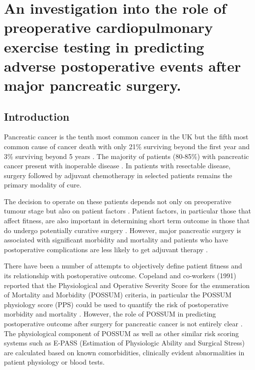 
\chapter{An investigation into the role of preoperative cardiopulmonary exercise testing in predicting adverse postoperative events after major pancreatic surgery.}
 
\label{ch_cpet_outcomes}
 
\clearpage
 
\section{Introduction}
Pancreatic cancer is the tenth most common cancer in the UK but the fifth most common cause of cancer death with only 21\% surviving beyond the first year and 3\% surviving beyond 5 years \parencite{cancerresearchuk_cancer_2011}. 
The majority of patients (80-85\%) with pancreatic cancer present with inoperable disease \parencite{cancerresearchuk_cancer_2011, sener_pancreatic_1999}. 
In patients with resectable disease, surgery \parencite{sener_pancreatic_1999, sohn_resected_2000, geer_prognostic_1993} followed by adjuvant chemotherapy in selected patients \parencite{neoptolemos_randomized_2004,neoptolemos_adjuvant_2009} remains the primary modality of cure.

The decision to operate on these patients depends not only on preoperative tumour stage but also on patient factors \parencite{bilimoria_national_2007, sandroussi_sociodemographics_2010}. 
Patient factors, in particular those that affect fitness, are also important in determining short term outcome in those that do undergo potentially curative surgery \parencite{mann_review_2010, mayo_management_2012}. 
However, major pancreatic surgery is associated with significant morbidity and mortality and patients who have postoperative complications are less likely to get adjuvant therapy \parencite{teh_patient_2009}.

There have been a number of attempts to objectively define patient fitness and its relationship with postoperative outcome. 
Copeland and co-workers (1991) reported that the Physiological and Operative Severity Score for the enumeration of Mortality and Morbidity (POSSUM) criteria, in particular the POSSUM physiology score (PPS) could be used to quantify the risk of postoperative morbidity and mortality \parencite{copeland_possum:_1991}. 
However, the role of POSSUM in predicting postoperative outcome after surgery for pancreatic cancer is not entirely clear \parencite{de_castro_evaluation_2009, khan_evaluation_2003, kocher_risk-adjustment_2005, pratt_possum_2008, tamijmarane_application_2008}. 
The physiological component of POSSUM as well as other similar risk scoring systems such as E-PASS (Estimation of Physiologic Ability and Surgical Stress)\parencite{haga_estimation_1999} are calculated based on known comorbidities, clinically evident abnormalities in patient physiology or blood tests.

